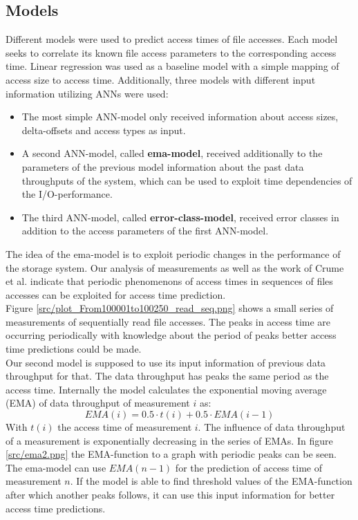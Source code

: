 \documentclass{superfri}
\begin{document}
\subsection{Models}
Different models were used to predict access times of file accesses.
Each model seeks to correlate its known file access parameters to the corresponding access time. 
Linear regression was used as a baseline model with a simple mapping of access size to access time.
Additionally, three models with different input information utilizing ANNs were used:
\begin{itemize}
	\item The most simple ANN-model only received information about access sizes, delta-offsets and access types as input.
	\item A second ANN-model, called \textbf{ema-model}, received additionally to the parameters of the previous model information about the past data throughputs of the system, which can be used to exploit time dependencies of the I/O-performance.
	\item The third ANN-model, called \textbf{error-class-model}, received error classes in addition to the access parameters of the first ANN-model.
\end{itemize}\medskip

The idea of the ema-model is to exploit periodic changes in the performance of the storage system.
Our analysis of measurements as well as the work of Crume et al. \cite{Crume:2013:FML:2538542.2538561} indicate that periodic phenomenons of access times in sequences of files accesses can be exploited for access time prediction.\\
Figure \ref{src/plot_From100001to100250_read_seq.png} shows a small series of measurements of sequentially read file accesses.
The peaks in access time are occurring periodically with knowledge about the period of peaks better access time predictions could be made.
\\
Our second model is supposed to use its input information of previous data throughput for that.
The data throughput has peaks the same period as the access time.
Internally the model calculates the exponential moving average (EMA) of data throughput of measurement $i$ as:
\begin{equation}
EMA(i) = 0.5 \cdot t(i)+ 0.5 \cdot EMA(i-1)
\end{equation}
With $t(i)$ the access time of measurement $i$.
The influence of data throughput of a measurement is exponentially decreasing in the series of EMAs.
In figure \ref{src/ema2.png} the EMA-function to a graph with periodic peaks can be seen.
\\
The ema-model can use $EMA(n-1)$ for the prediction of access time of measurement $n$.
If the model is able to find threshold values of the EMA-function after which another peaks follows, it can use this input information for better access time predictions.\medskip
\end{document}
